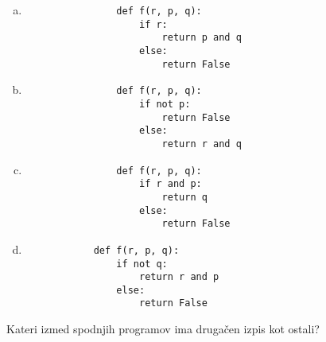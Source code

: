 \documentclass[arhiv, 10pt]{../izpit}
\begin{document}
        \begin{multicols}{2}
        \begin{enumerate}[(a)]
\item 
                \begin{verbatim}
                def f(r, p, q):
                    if r:
                        return p and q
                    else:
                        return False
                \end{verbatim}
            
\item 
                \begin{verbatim}
                def f(r, p, q):
                    if not p:
                        return False
                    else:
                        return r and q
                \end{verbatim}
            
\item 
                \begin{verbatim}
                def f(r, p, q):
                    if r and p:
                        return q
                    else:
                        return False
                \end{verbatim}
            
\item 
            \begin{verbatim}
            def f(r, p, q):
                if not q:
                    return r and p
                else:
                    return False
            \end{verbatim}
        
\end{enumerate}

        \end{multicols}
    
        \naloga*
        
        Kateri izmed spodnjih programov ima drugačen izpis kot ostali?
    
\end{document}
